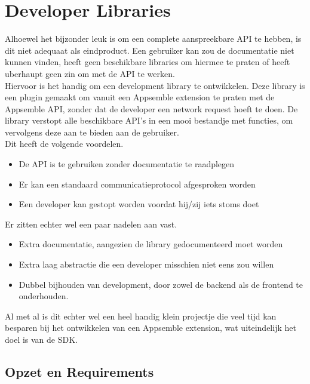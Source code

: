 \chapter{Developer Libraries}

Alhoewel het bijzonder leuk is om een complete aanspreekbare API te hebben, is dit niet adequaat als eindproduct. Een gebruiker kan zou de documentatie niet kunnen vinden, heeft geen beschikbare libraries om hiermee te praten of heeft uberhaupt geen zin om met de API te werken. \\

Hiervoor is het handig om een development library te ontwikkelen. Deze library is een plugin gemaakt om vanuit een Appsemble extension te praten met de Appsemble API, zonder dat de developer een network request hoeft te doen. De library verstopt alle beschikbare API's in een mooi bestandje met functies, om vervolgens deze aan te bieden aan de gebruiker. \\ 

Dit heeft de volgende voordelen.

\begin{itemize}
	\item De API is te gebruiken zonder documentatie te raadplegen
	\item Er kan een standaard communicatieprotocol afgesproken worden
	\item Een developer kan gestopt worden voordat hij/zij iets stoms doet
\end{itemize}

Er zitten echter wel een paar nadelen aan vast.

\begin{itemize}
	\item Extra documentatie, aangezien de library gedocumenteerd moet worden
	\item Extra laag abstractie die een developer misschien niet eens zou willen
	\item Dubbel bijhouden van development, door zowel de backend als de frontend te onderhouden.
\end{itemize}

Al met al is dit echter wel een heel handig klein projectje die veel tijd kan besparen bij het ontwikkelen van een Appsemble extension, wat uiteindelijk het doel is van de SDK. \\

\section{Opzet en Requirements}

